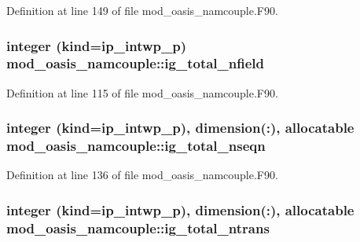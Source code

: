 Definition at line 149 of file mod\+\_\+oasis\+\_\+namcouple.\+F90.

\hypertarget{classmod__oasis__namcouple_a3de3e6eb2bf1e81d77e9c117b7d5985f}{
\subsubsection[{ig\+\_\+total\+\_\+nfield}]{\setlength{\rightskip}{0pt plus 5cm}integer (kind=ip\+\_\+intwp\+\_\+p) mod\+\_\+oasis\+\_\+namcouple\+::ig\+\_\+total\+\_\+nfield\hspace{0.3cm}{\ttfamily [private]}}}\label{classmod__oasis__namcouple_a3de3e6eb2bf1e81d77e9c117b7d5985f}


Definition at line 115 of file mod\+\_\+oasis\+\_\+namcouple.\+F90.

\hypertarget{classmod__oasis__namcouple_a09ed8be682296ef584f0d5777b2c6482}{
\subsubsection[{ig\+\_\+total\+\_\+nseqn}]{\setlength{\rightskip}{0pt plus 5cm}integer (kind=ip\+\_\+intwp\+\_\+p), dimension(\+:), allocatable mod\+\_\+oasis\+\_\+namcouple\+::ig\+\_\+total\+\_\+nseqn\hspace{0.3cm}{\ttfamily [private]}}}\label{classmod__oasis__namcouple_a09ed8be682296ef584f0d5777b2c6482}


Definition at line 136 of file mod\+\_\+oasis\+\_\+namcouple.\+F90.

\hypertarget{classmod__oasis__namcouple_abbd7bd184bb2a3860063dbb9f109f427}{
\subsubsection[{ig\+\_\+total\+\_\+ntrans}]{\setlength{\rightskip}{0pt plus 5cm}integer (kind=ip\+\_\+intwp\+\_\+p), dimension(\+:), allocatable mod\+\_\+oasis\+\_\+namcouple\+::ig\+\_\+total\+\_\+ntrans\hspace{0.3cm}{\ttfamily [private]}}}\label{classmod__oasis__namcouple_abbd7bd184bb2a3860063dbb9f109f427}


